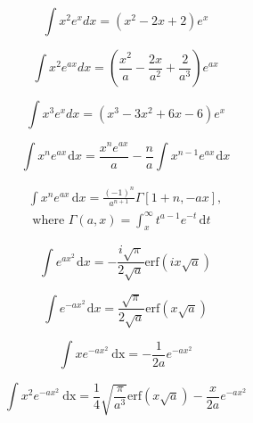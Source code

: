 \documentclass[../main.tex]{subfiles}
\begin{document}
    \begin{equation*}
    \int x^2 e^{x} dx = \left(x^2 - 2x + 2\right) e^{x}
    \end{equation*}
    
    \begin{equation*}
    \int x^2 e^{ax} dx = \left(\frac{x^2}{a}-\frac{2x}{a^2}+\frac{2}{a^3}\right) e^{ax} 
    \end{equation*}
    
    \begin{equation*}
    \int x^3 e^{x} dx = \left(x^3-3x^2 + 6x - 6\right) e^{x} 
    \end{equation*}
     
    \begin{equation*}
    \int x^n e^{ax}\hspace{1pt}\text{d}x = \dfrac{x^n e^{ax}}{a} - 
    \dfrac{n}{a}\int x^{n-1}e^{ax}\hspace{1pt}\text{d}x
    \end{equation*} 
     
    \begin{equation*}
    \begin{split}
    \int x^n e^{ax}\hspace{2pt}\text{d}x = \frac{(-1)^n}{a^{n+1}}\Gamma[1+n,-ax], \\
     \text{ where } \Gamma(a,x)=\int_x^{\infty} t^{a-1}e^{-t}\hspace{2pt}\text{d}t
     \end{split}
     \end{equation*}
    
    \begin{equation*}
    \int e^{ax^2}\hspace{1pt}\text{d}x = -\frac{i\sqrt{\pi}}{2\sqrt{a}}\text{erf}\left(ix\sqrt{a}\right) 
    \end{equation*}
    
    \begin{equation*}
    \int e^{-ax^2}\hspace{1pt}\text{d}x = \frac{\sqrt{\pi}}{2\sqrt{a}}\text{erf}\left(x\sqrt{a}\right) 
    \end{equation*}
    
    \begin{equation*}
    \int x e^{-ax^2}\ \text{dx} = -\dfrac{1}{2a}e^{-ax^2} 
    \end{equation*}
    
    \begin{equation*}
    \int x^2 e^{-ax^2}\ \text{dx} = \dfrac{1}{4}\sqrt{\dfrac{\pi}{a^3}}\text{erf}(x\sqrt{a}) -\dfrac{x}{2a}e^{-ax^2}
    \end{equation*}
\end{document}
